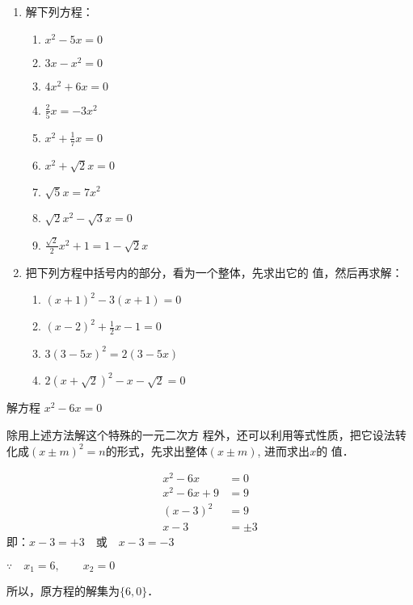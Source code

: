 \begin{ex}
\begin{enumerate}
    \item 解下列方程：
\begin{multicols}{2}
    \begin{enumerate}
    \item $x^{2}-5 x=0$
    \item $3 x-x^{2}=0$
    \item $4 x^{2}+6 x=0$
    \item $\frac{2}{5} x=-3 x^{2}$
    \item $x^{2}+\frac{1}{7} x=0$
    \item $x^{2}+\sqrt{2} x=0$
    \item $\sqrt{5} x=7 x^{2}$
    \item  $\sqrt{2} x^{2}-\sqrt{3} x=0$
    \item $\frac{\sqrt{2}}{2} x^{2}+1=1-\sqrt{2} x$
\end{enumerate}
\end{multicols}
\item 把下列方程中括号内的部分，看为一个整体，先求出它的
值，然后再求解：
\begin{multicols}{2}
\begin{enumerate}
    \item $(x+1)^{2}-3(x+1)=0$
    \item $(x-2)^{2}+\frac{1}{2} x-1=0$
    \item $3(3-5 x)^{2}=2(3-5 x)$
    \item $2(x+\sqrt{2})^{2}-x-\sqrt{2}=0$
\end{enumerate}
\end{multicols}
\end{enumerate}
\end{ex}

\begin{example}
解方程 $x^2-6x=0$
\end{example}

\begin{analyze}
    除用上述方法解这个特殊的一元二次方
程外，还可以利用等式性质，把它设法转化成$(x\pm 
m)^2=n$的形式，先求出整体$(x\pm m)$, 进而求出$x$的
值．
\end{analyze}

\begin{solution}
\begin{align*}
    x^2-6x&=0\\
    x^2-6x+9&=9 \tag{两边加上9}\\
    (x-3)^2&=9\\
    x-3&=\pm 3  \tag{平方根的意义}
\end{align*}    
即：$x-3=+3\quad \text{或}\quad x-3=-3$

$\because\quad x_1=6,\qquad x_2=0$

所以，原方程的解集为$\{6,0\}$．
\end{solution}


